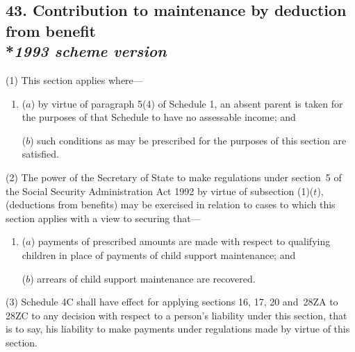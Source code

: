 \documentclass[12pt,a4paper]{article}
\begin{document}

\subsection[43. Contribution to maintenance by deduction from benefit --- \emph{1993 scheme version}]{43. Contribution to maintenance by deduction from benefit\\*\emph{1993 scheme version}}

(1) This section applies where—
\begin{enumerate}\item[]
($a$) by virtue of paragraph 5(4)  of Schedule 1, an absent parent is taken for the purposes of that Schedule to have no assessable income; and

($b$) such conditions as may be prescribed for the purposes of this section are satisfied.
\end{enumerate}

(2) The power of the Secretary of State to make regulations under 
section~5 of the Social Security Administration Act 1992 by virtue of subsection (1)($t$),  %
(deductions from benefits) may be exercised in relation to cases to which this section applies with a view to securing that—
\begin{enumerate}\item[]
($a$) payments of prescribed amounts are made with respect to qualifying children in place of payments of child support maintenance; and

($b$) arrears of child support maintenance are recovered.
\end{enumerate}

(3) Schedule 4C shall have effect for applying sections 16, 17, 20 and~28ZA to 28ZC to any decision with respect to a person’s liability under this section, that is to say, his liability to make payments under regulations made by virtue of this section.

\end{document}
